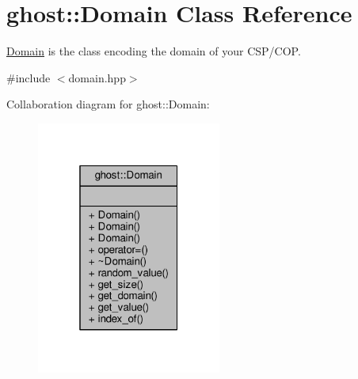 \hypertarget{classghost_1_1Domain}{}\section{ghost\+:\+:Domain Class Reference}
\label{classghost_1_1Domain}


\hyperlink{classghost_1_1Domain}{Domain} is the class encoding the domain of your C\+S\+P/\+C\+OP.  




{\ttfamily \#include $<$domain.\+hpp$>$}



Collaboration diagram for ghost\+:\+:Domain\+:\nopagebreak
\begin{figure}[H]
\begin{center}
\leavevmode
\includegraphics[width=172pt]{classghost_1_1Domain__coll__graph}
\end{center}
\end{figure}
